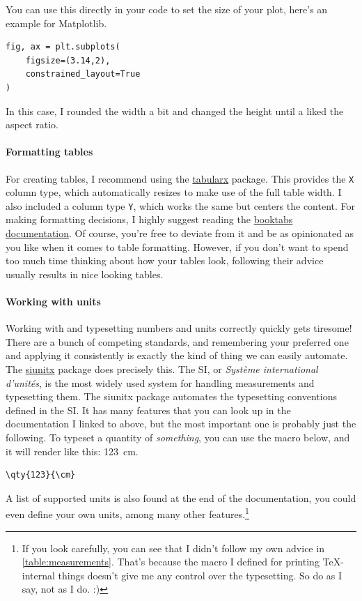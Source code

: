 \documentclass{3s-report}
\begin{document}
    \noindent You can use this directly in your code to set the size of your plot, here's an example for Matplotlib.
    \begin{verbatim}
fig, ax = plt.subplots(
    figsize=(3.14,2),
    constrained_layout=True
)
    \end{verbatim}
    In this case, I rounded the width a bit and changed the height until a liked the aspect ratio.

    \paragraph{Formatting tables}
    For creating tables, I recommend using the \href{https://ftp.agdsn.de/pub/mirrors/latex/dante/macros/latex/required/tools/tabularx.pdf}{tabularx} package.
    This provides the \texttt{X} column type, which automatically resizes to make use of the full table width.
    I also included a column type \texttt{Y}, which works the same but centers the content.
    For making formatting decisions, I highly suggest reading the \href{https://ctan.joethei.xyz/macros/latex/contrib/booktabs/booktabs.pdf}{booktabs documentation}.
    Of course, you're free to deviate from it and be as opinionated as you like when it comes to table formatting.
    However, if you don't want to spend too much time thinking about how your tables look, following their advice usually results in nice looking tables.

    \paragraph{Working with units}
    Working with and typesetting numbers and units correctly quickly gets tiresome!
    There are a bunch of competing standards, and remembering your preferred one and applying it consistently is exactly the kind of thing we can easily automate.
    The \href{https://ftp.gwdg.de/pub/ctan/macros/latex/contrib/siunitx/siunitx.pdf}{siunitx} package does precisely this.
    The SI, or \emph{Système international d'unités}, is the most widely used system for handling measurements and typesetting them.
    The siunitx package automates the typesetting conventions defined in the SI.
    It has many features that you can look up in the documentation I linked to above, but the most important one is probably just the following.
    To typeset a quantity of \emph{something}, you can use the macro below, and it will render like this: \qty{123}{\cm}.
    \begin{verbatim}
\qty{123}{\cm}
    \end{verbatim}
    A list of supported units is also found at the end of the documentation, you could even define your own units, among many other features.\!\footnote{
        If you look carefully, you can see that I didn't follow my own advice in \cref{table:measurements}.
        That's because the macro I defined for printing TeX-internal things doesn't give me any control over the typesetting.
        So do as I say, not as I do. :)
    }
\end{document}
